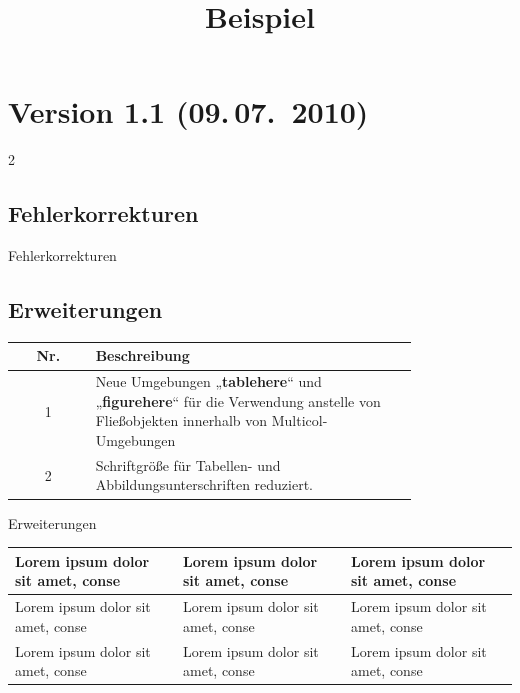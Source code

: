 \documentclass[serifmath,a0paper,noDIN,MathematikA0]{tudmathposter}
\begin{document}
\section{Version 1.1 (09.\,07.~2010)}
\begin{multicols}2
  \subsection{Fehlerkorrekturen}
 \begin{figurehere}
    \centerline{%
    }
    \caption{Fehlerkorrekturen}
  \end{figurehere}
  \subsection{Erweiterungen}
  \begin{tablehere}
    \centering
    \begin{farbtabellen}
      \begin{tabular}{||c|p{0.8\linewidth}||}
        \hline\hline
        Nr.&Beschreibung\\\hline\hline
        1&Neue Umgebungen „\textbf{tablehere}“ und „\textbf{figurehere}“ für die Verwendung
        anstelle von Fließobjekten innerhalb von Multicol-Umgebungen\\\hline
        2&Schriftgröße für Tabellen- und Abbildungsunterschriften reduziert.\\\hline
      \end{tabular}
    \end{farbtabellen}
    \caption{Erweiterungen}
  \end{tablehere}
\end{multicols}
\label{Updende}
\clearpage
{}%
\title{Beispiel}%
\maketitle
{}

\begin{farbtabellen}
\begin{tabularx}{\linewidth}{|X|X|X|}
\hline
Lorem ipsum dolor sit amet, conse&
Lorem ipsum dolor sit amet, conse&
Lorem ipsum dolor sit amet, conse\\\hline
Lorem ipsum dolor sit amet, conse&
Lorem ipsum dolor sit amet, conse&
Lorem ipsum dolor sit amet, conse\\\hline
Lorem ipsum dolor sit amet, conse&
Lorem ipsum dolor sit amet, conse&
Lorem ipsum dolor sit amet, conse\\\hline
\end{tabularx}
\end{farbtabellen}
\end{document}
